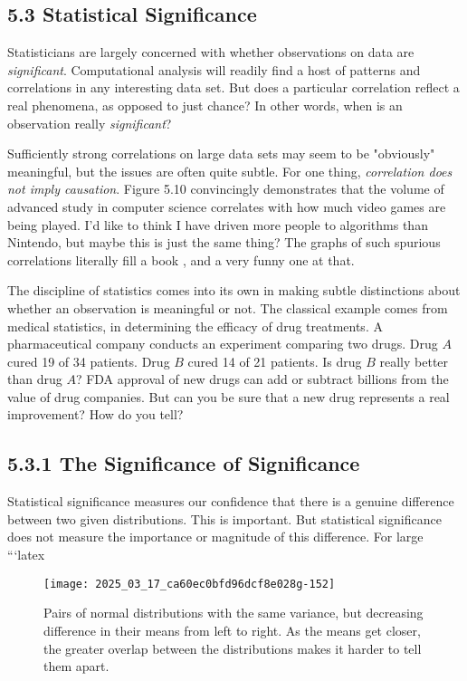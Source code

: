 \documentclass[10pt]{article}
\begin{document}
\subsection*{5.3 Statistical Significance}
Statisticians are largely concerned with whether observations on data are \emph{significant}. Computational analysis will readily find a host of patterns and correlations in any interesting data set. But does a particular correlation reflect a real phenomena, as opposed to just chance? In other words, when is an observation really \emph{significant}?

Sufficiently strong correlations on large data sets may seem to be "obviously" meaningful, but the issues are often quite subtle. For one thing, \emph{correlation does not imply causation}. Figure 5.10 convincingly demonstrates that the volume of advanced study in computer science correlates with how much video games are being played. I'd like to think I have driven more people to algorithms than Nintendo, but maybe this is just the same thing? The graphs of such spurious correlations literally fill a book \cite{Vig15}, and a very funny one at that.

The discipline of statistics comes into its own in making subtle distinctions about whether an observation is meaningful or not. The classical example comes from medical statistics, in determining the efficacy of drug treatments. A pharmaceutical company conducts an experiment comparing two drugs. Drug $A$ cured 19 of 34 patients. Drug $B$ cured 14 of 21 patients. Is drug $B$ really better than drug $A$? FDA approval of new drugs can add or subtract billions from the value of drug companies. But can you be sure that a new drug represents a real improvement? How do you tell?

\subsection*{5.3.1 The Significance of Significance}
Statistical significance measures our confidence that there is a genuine difference between two given distributions. This is important. But statistical significance does not measure the importance or magnitude of this difference. For large
```latex
\begin{figure}[h]
    \centering
    \texttt{[image: 2025\_03\_17\_ca60ec0bfd96dcf8e028g-152]}
    \caption{Pairs of normal distributions with the same variance, but decreasing difference in their means from left to right. As the means get closer, the greater overlap between the distributions makes it harder to tell them apart.}
    \label{fig:distributions-mean-difference}
\end{figure}
\end{document}
